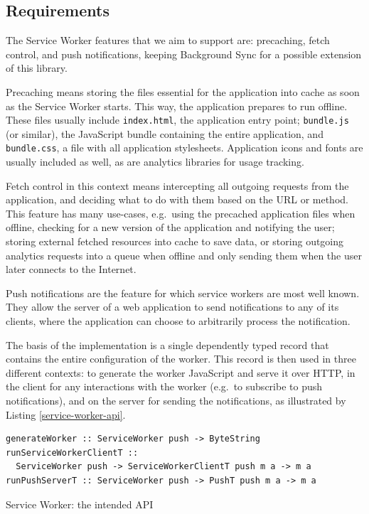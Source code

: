 \documentclass[english,zadani,odsaz]{fitthesis}
\begin{document}
\subsection{Requirements}
\label{sec:orgb6ce156}
The Service Worker features that we aim to support are: precaching, fetch
control, and push notifications, keeping Background Sync for a possible
extension of this library.

Precaching means storing the files essential for the application into cache as
soon as the Service Worker starts. This way, the application prepares to run
offline. These files usually include \texttt{index.html}, the application entry point;
\texttt{bundle.js} (or similar), the JavaScript bundle containing the entire application,
and \texttt{bundle.css}, a file with all application stylesheets. Application icons and
fonts are usually included as well, as are analytics libraries for usage
tracking.

Fetch control in this context means intercepting all outgoing requests from the
application, and deciding what to do with them based on the URL or method. This
feature has many use-cases, e.g.~using the precached application files when
offline, checking for a new version of the application and notifying the user;
storing external fetched resources into cache to save data, or storing outgoing
analytics requests into a queue when offline and only sending them when the user
later connects to the Internet.

Push notifications are the feature for which service workers are most well
known. They allow the server of a web application to send notifications to any
of its clients, where the application can choose to arbitrarily process the
notification.

The basis of the implementation is a single dependently typed record that
contains the entire configuration of the worker. This record is then used in
three different contexts: to generate the worker JavaScript and serve it over
HTTP, in the client for any interactions with the worker (e.g.~to subscribe to
push notifications), and on the server for sending the notifications, as
illustrated by Listing \ref{service-worker-api}.

\begin{listing}[b]
\begin{verbatim}
generateWorker :: ServiceWorker push -> ByteString
runServiceWorkerClientT ::
  ServiceWorker push -> ServiceWorkerClientT push m a -> m a
runPushServerT :: ServiceWorker push -> PushT push m a -> m a
\end{verbatim}
\caption{Service Worker: the intended API \label{service-worker-api}}
\end{listing}
\end{document}
